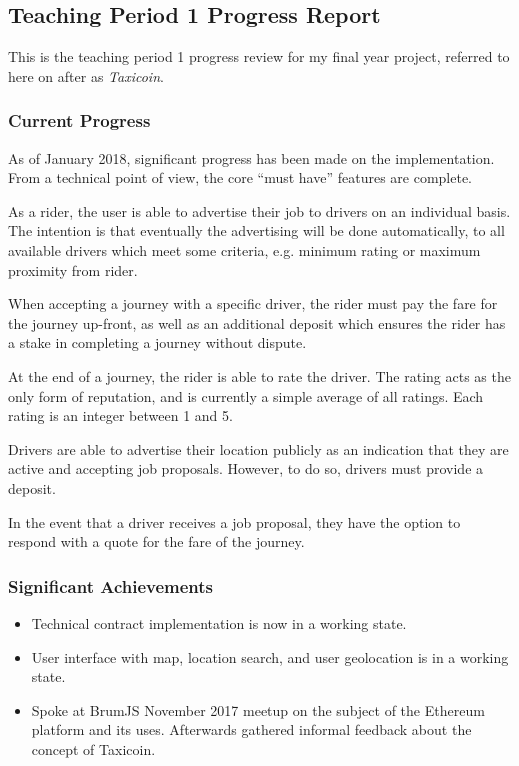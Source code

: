 \subsection*{Teaching Period 1 Progress Report}

This is the teaching period 1 progress review for my final year project, referred to here on after as \textit{Taxicoin}.

\subsubsection*{Current Progress}

As of January 2018, significant progress has been made on the implementation. From a technical point of view, the core ``must have'' features are complete.

As a rider, the user is able to advertise their job to drivers on an individual basis. The intention is that eventually the advertising will be done automatically, to all available drivers which meet some criteria, e.g. minimum rating or maximum proximity from rider.

When accepting a journey with a specific driver, the rider must pay the fare for the journey up-front, as well as an additional deposit which ensures the rider has a stake in completing a journey without dispute.

At the end of a journey, the rider is able to rate the driver. The rating acts as the only form of reputation, and is currently a simple average of all ratings. Each rating is an integer between 1 and 5.

Drivers are able to advertise their location publicly as an indication that they are active and accepting job proposals. However, to do so, drivers must provide a deposit.

In the event that a driver receives a job proposal, they have the option to respond with a quote for the fare of the journey.

\subsubsection*{Significant Achievements}

\begin{itemize}
    \item Technical contract implementation is now in a working state.
    \item User interface with map, location search, and user geolocation is in a working state.
    \item Spoke at BrumJS November 2017 meetup on the subject of the Ethereum platform and its uses. Afterwards gathered informal feedback about the concept of Taxicoin.
\end{itemize}

